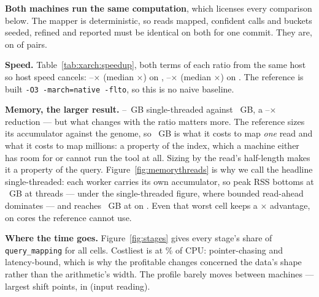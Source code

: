 \documentclass[10pt,a4paper,twocolumn]{article}
\begin{document}
\textbf{Both machines run the same computation}, which licenses every
comparison below. The mapper is deterministic, so reads mapped, confident
calls and buckets seeded, refined and reported must be identical on both for
one commit. They are, on \shmAgreeCells{} of \shmAgreeTotal{} pairs.

\textbf{Speed.} Table~\ref{tab:xarch:speedup}, both terms of each ratio from
the same host so host speed cancels:
\shmSpeedupXMin--\shmSpeedupXMax$\times$ (median \shmSpeedupXMedian$\times$) on
\texttt{\shmHostX}, \shmSpeedupAMin--\shmSpeedupAMax$\times$ (median
\shmSpeedupAMedian$\times$) on \texttt{\shmHostA}. The reference is built
\texttt{-O3 -march=native -flto}, %
so this is no naive baseline.

{%
}

\textbf{Memory, the larger result.} \shmRssRsMin--\shmRssRsMax~GB
single-threaded against \shmRssCpp~GB, a
\shmRssRatioMin--\shmRssRatioMax$\times$ reduction --- but what changes with the
ratio matters more. The reference sizes its accumulator against the genome, so
\shmRssCpp~GB is what it costs to map \emph{one} read and what it costs to map
millions: a property of the index, which a machine either has room for or
cannot run the tool at all. Sizing by the read's half-length makes it a
property of the query. Figure~\ref{fig:memorythreads} is why we call the
headline single-threaded: each worker carries its own accumulator, so peak RSS
bottoms at \shmRssRsFloor~GB at \shmRssRsFloorThreads{} threads --- under the
single-threaded figure, where bounded read-ahead dominates --- and reaches
\shmRssRsCap~GB at \shmCapThreads{} on \shmRssRsCapBench. Even that worst cell
keeps a \shmRssRatioCap$\times$ advantage, on cores the reference cannot use.

{%
}

\textbf{Where the time goes.} Figure~\ref{fig:stages} gives every stage's share
of \texttt{query\_mapping} for all \shmNumCells{} cells. Costliest is
\texttt{\shmTopStage} at \shmTopStageShare\% of CPU: pointer-chasing and
latency-bound, which is why the profitable changes concerned the data's shape
rather than the arithmetic's width. The profile barely moves between machines ---
largest shift \shmShiftPP{} points, in \texttt{\shmShiftStage} (input reading).
\end{document}
